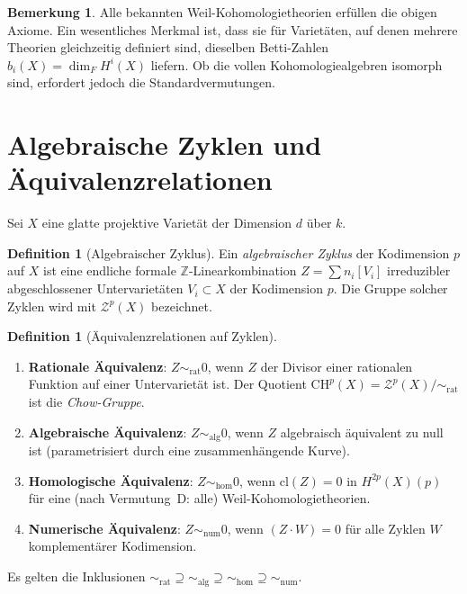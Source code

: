 \documentclass[12pt,a4paper]{amsart}
\theoremstyle{definition}
\newtheorem{bemerkung}[theorem]{Bemerkung}
\newtheorem{definition_de}[theorem]{Definition}
\newcommand{\Z}{\mathbb{Z}}
\newcommand{\CH}{\mathrm{CH}}
\newcommand{\cl}{\mathrm{cl}}
\begin{document}
\begin{bemerkung}
Alle bekannten Weil-Kohomologietheorien erfüllen die obigen Axiome.
Ein wesentliches Merkmal ist, dass sie für Varietäten, auf denen mehrere
Theorien gleichzeitig definiert sind, dieselben Betti-Zahlen $b_i(X) = \dim_F H^i(X)$
liefern.  Ob die vollen Kohomologiealgebren isomorph sind, erfordert jedoch die
Standardvermutungen.
\end{bemerkung}

\section{Algebraische Zyklen und Äquivalenzrelationen}\label{sec:zyklen}

Sei $X$ eine glatte projektive Varietät der Dimension $d$ über $k$.

\begin{definition_de}[Algebraischer Zyklus]
Ein \emph{algebraischer Zyklus} der Kodimension $p$ auf $X$ ist eine
endliche formale $\Z$-Linearkombination $Z = \sum n_i [V_i]$ irreduzibler
abgeschlossener Untervarietäten $V_i \subset X$ der Kodimension $p$.
Die Gruppe solcher Zyklen wird mit $\mathcal{Z}^p(X)$ bezeichnet.
\end{definition_de}

\begin{definition_de}[Äquivalenzrelationen auf Zyklen]
\begin{enumerate}[label=(\roman*)]
  \item \textbf{Rationale Äquivalenz}: $Z \sim_{\mathrm{rat}} 0$, wenn $Z$
        der Divisor einer rationalen Funktion auf einer Untervarietät ist.
        Der Quotient $\CH^p(X) = \mathcal{Z}^p(X)/{\sim_{\mathrm{rat}}}$
        ist die \emph{Chow-Gruppe}.
  \item \textbf{Algebraische Äquivalenz}: $Z \sim_{\mathrm{alg}} 0$, wenn
        $Z$ algebraisch äquivalent zu null ist (parametrisiert durch eine
        zusammenhängende Kurve).
  \item \textbf{Homologische Äquivalenz}: $Z \sim_{\mathrm{hom}} 0$, wenn
        $\cl(Z) = 0$ in $H^{2p}(X)(p)$ für eine (nach Vermutung~D: alle)
        Weil-Kohomologietheorien.
  \item \textbf{Numerische Äquivalenz}: $Z \sim_{\mathrm{num}} 0$, wenn
        $(Z \cdot W) = 0$ für alle Zyklen $W$ komplementärer Kodimension.
\end{enumerate}
Es gelten die Inklusionen
${\sim_{\mathrm{rat}}} \supseteq {\sim_{\mathrm{alg}}} \supseteq
 {\sim_{\mathrm{hom}}} \supseteq {\sim_{\mathrm{num}}}$.
\end{definition_de}
\end{document}
